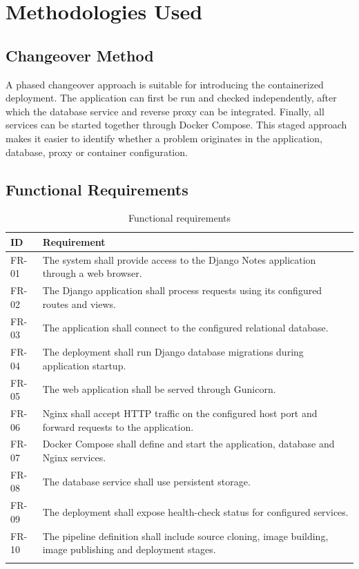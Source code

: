 \documentclass[12pt,a4paper,oneside]{report}
\begin{document}
\chapter{Methodologies Used}

\section{Changeover Method}
A phased changeover approach is suitable for introducing the containerized deployment. The application can first be run and checked independently, after which the database service and reverse proxy can be integrated. Finally, all services can be started together through Docker Compose. This staged approach makes it easier to identify whether a problem originates in the application, database, proxy or container configuration.

\section{Functional Requirements}
\begin{longtable}{|p{}|p{}|}
\hline
\textbf{ID} & \textbf{Requirement}\\ \hline
FR-01 & The system shall provide access to the Django Notes application through a web browser.\\ \hline
FR-02 & The Django application shall process requests using its configured routes and views.\\ \hline
FR-03 & The application shall connect to the configured relational database.\\ \hline
FR-04 & The deployment shall run Django database migrations during application startup.\\ \hline
FR-05 & The web application shall be served through Gunicorn.\\ \hline
FR-06 & Nginx shall accept HTTP traffic on the configured host port and forward requests to the application.\\ \hline
FR-07 & Docker Compose shall define and start the application, database and Nginx services.\\ \hline
FR-08 & The database service shall use persistent storage.\\ \hline
FR-09 & The deployment shall expose health-check status for configured services.\\ \hline
FR-10 & The pipeline definition shall include source cloning, image building, image publishing and deployment stages.\\ \hline
\caption{Functional requirements}
\label{tab:functional}
\end{longtable}
\end{document}
